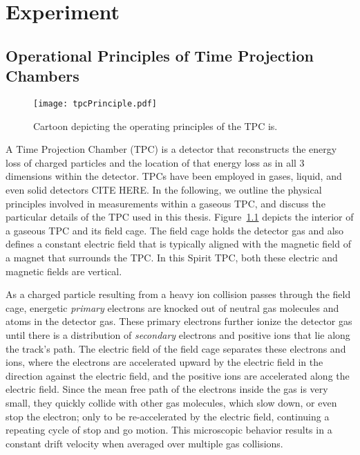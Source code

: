 \chapter{Experiment}

\section{Operational Principles of Time Projection Chambers}

\begin{figure}[!htb]
\centering
\texttt{[image: tpcPrinciple.pdf]}
\caption{Cartoon depicting the operating principles of the TPC is.}
\label{fig:tpcPrinciple}
\end{figure}

A Time Projection Chamber (TPC) is a detector that reconstructs the energy loss of charged particles and the location of that energy loss as in all 3 dimensions within the detector. TPCs have been employed in gases, liquid, and even solid detectors CITE HERE. In the following, we outline the physical principles involved in measurements within a gaseous TPC, and discuss the particular details of the TPC used in this thesis. Figure~\ref{fig:tpcPrinciple} depicts the interior of a gaseous TPC and its field cage. The field cage holds the detector gas and also defines a constant electric field that is typically aligned with the magnetic field of a magnet that surrounds the TPC. In this Spirit TPC, both these electric and magnetic fields are vertical.  

As a charged particle resulting from a heavy ion collision passes through the field cage, energetic \emph{primary} electrons are knocked out of neutral gas molecules and atoms in the detector gas. These primary electrons further ionize the detector gas until there is a distribution of \emph{secondary} electrons and positive ions that lie along the track's path. The electric field of the field cage separates these electrons and ions, where the electrons are accelerated upward by the electric field in the direction against the electric field, and the positive ions are accelerated along the electric field. Since the mean free path of the electrons inside the gas is very small, they quickly collide with other gas molecules, which slow down, or even stop the electron; only to be re-accelerated by the electric field, continuing a repeating cycle of stop and go motion. This microscopic behavior results in a constant drift velocity when averaged over multiple gas collisions. 


